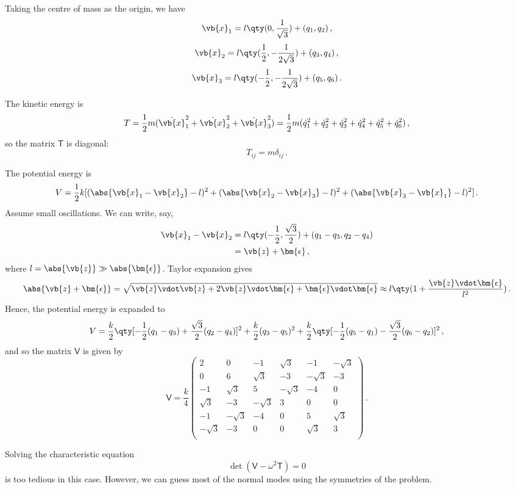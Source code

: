 \documentclass{article}
\theoremstyle{plain}\theoremheaderfont{\normalfont\itshape}\theorembodyfont{\rmfamily}\theoremseparator{.}\newtheorem*{rem}{Remark}\newtheorem*{ex}{Example}\newtheorem*{proof}{Proof}\newtheorem*{altp}{Alternative proof}
\theoremstyle{plain}\theoremheaderfont{\normalfont\bfseries}\theorembodyfont{\rmfamily}\theoremseparator{.}\newtheorem{thm}{Theorem}[section]\newtheorem{lem}[thm]{Lemma}\newtheorem{prop}[thm]{Proposition}\newtheorem*{cor}{Corollary}\newtheorem{defn}[thm]{Definition}\newtheorem{clm}[thm]{Claim}\newtheorem{clminproof}{Claim}
\theoremstyle{break}\theoremheaderfont{\normalfont\itshape}\theorembodyfont{\rmfamily}\theoremseparator{.\medskip}\newtheorem*{proofskip}{Proof}\newtheorem*{exs}{Examples}\newtheorem*{rems}{Remarks}
\theoremstyle{break}\theoremheaderfont{\normalfont\bfseries}\theorembodyfont{\rmfamily}\theoremseparator{.\medskip}\newtheorem{lemskip}[thm]{Lemma}\newtheorem{defnskip}[thm]{Definition}\newtheorem{propskip}[thm]{Proposition}\newtheorem{thmskip}[thm]{Theorem}
\numberwithin{equation}{section}
\begin{document}
	Taking the centre of mass as the origin, we have
	\[\vb{x}_1=l\qty(0,\frac{1}{\sqrt{3}})+(q_1,q_2)\,,\]
	\[\vb{x}_2=l\qty(\frac{1}{2},-\frac{1}{2\sqrt{3}})+(q_3,q_4)\,,\]
	\[\vb{x}_3=l\qty(-\frac{1}{2},-\frac{1}{2\sqrt{3}})+(q_5,q_6)\,.\]

	The kinetic energy is
	\[T=\frac{1}{2}m(\dot{\vb{x}}_1^2+\dot{\vb{x}}_2^2+\dot{\vb{x}}_3^2)=\frac{1}{2}m(\dot{q}_1^2+\dot{q}_2^2+\dot{q}_3^2+\dot{q}_4^2+\dot{q}_5^2+\dot{q}_6^2)\,,\]
	so the matrix \(\mathsf{T}\) is diagonal:
	\[T_{ij}=m\delta_{ij}\,.\]

	The potential energy is
	\[V=\frac{1}{2}k[(\abs{\vb{x}_1-\vb{x}_2}-l)^2+(\abs{\vb{x}_2-\vb{x}_3}-l)^2+(\abs{\vb{x}_3-\vb{x}_1}-l)^2]\,.\]
	Assume small oscillations. We can write, say,
	\begin{align*}
		\vb{x}_1-\vb{x}_2&=l\qty(-\frac{1}{2},\frac{\sqrt{3}}{2})+(q_1-q_3,q_2-q_4)\\
		&=\vb{z}+\bm{\epsilon}\,,
	\end{align*}
	where \(l=\abs{\vb{z}}\gg \abs{\bm{\epsilon}}\). Taylor expansion gives
	\[\abs{\vb{z}+\bm{\epsilon}}=\sqrt{\vb{z}\vdot\vb{z}+2\vb{z}\vdot\bm{\epsilon}+\bm{\epsilon}\vdot\bm{\epsilon}}\approx l\qty(1+\frac{\vb{z}\vdot\bm{\epsilon}}{l^2})\,.\]
	Hence, the potential energy is expanded to
	\[V=\frac{k}{2}\qty[-\frac{1}{2}(q_1-q_3)+\frac{\sqrt{3}}{2}(q_2-q_4)]^2+\frac{k}{2}(q_3-q_5)^2+\frac{k}{2}\qty[-\frac{1}{2}(q_5-q_1)-\frac{\sqrt{3}}{2}(q_6-q_2)]^2\,,\]
	and so the matrix \(\mathsf{V}\) is given by
	\[\mathsf{V}=\frac{k}{4}\begin{pmatrix}
		2 & 0 & -1 & \sqrt{3} & -1 & -\sqrt{3}\\
		0 & 6 & \sqrt{3} & -3 & -\sqrt{3} & -3\\
		-1 & \sqrt{3} & 5 & -\sqrt{3} & -4 & 0\\
		\sqrt{3} & -3 & -\sqrt{3} & 3 & 0 & 0\\
		-1 & -\sqrt{3} & -4 & 0 & 5 & \sqrt{3}\\
		-\sqrt{3} & -3 & 0 & 0 & \sqrt{3} & 3\\
	\end{pmatrix}\,.\]

	Solving the characteristic equation
	\[\det(\mathsf{V}-\omega^2\mathsf{T})=0\]
	is too tedious in this case. However, we can guess most of the normal modes using the symmetries of the problem.
\end{document}
